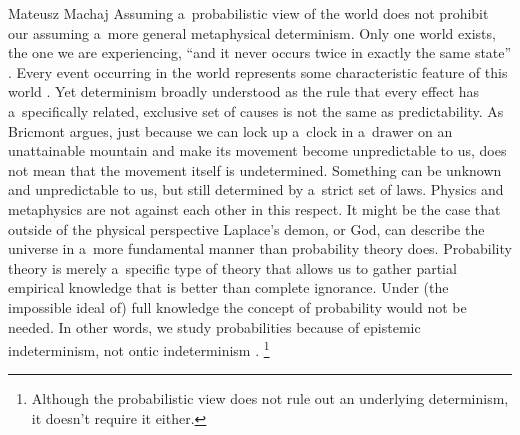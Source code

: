 \begin{artengenv}{Mateusz Machaj}
Assuming a~probabilistic view of the world does not prohibit our assuming a~more general metaphysical determinism. Only one world exists, the one we are experiencing, ``and it never occurs twice in exactly the same state'' 
\parencite[][p.4]{bricmont_determinism_2002}. %
 Every event occurring in the world represents some characteristic feature of this world 
\parencite[][p.397]{fetzer_world_1977}. %
 Yet determinism broadly understood as the rule that every effect has a~specifically related, exclusive set of causes is not the same as predictability. As Bricmont argues, just because we can lock up a~clock in a~drawer on an unattainable mountain and make its movement become unpredictable to us, does not mean that the movement itself is undetermined. Something can be unknown and unpredictable to us, but still determined by a~strict set of laws. Physics and metaphysics are not against each other in this respect. It might be the case that outside of the physical perspective Laplace's demon, or God, can describe the universe in a~more fundamental manner than probability theory does. Probability theory is merely a~specific type of theory that allows us to gather partial empirical knowledge that is better than complete ignorance. Under (the impossible ideal of) full knowledge the concept of probability would not be needed. In other words, we study probabilities because of epistemic indeterminism, not ontic indeterminism 
\parencite[][pp.371–372]{fetzer_probability_1983}.%
\footnote{Although the probabilistic view does not rule out an underlying determinism, it doesn't require it either.}




\end{artengenv}
